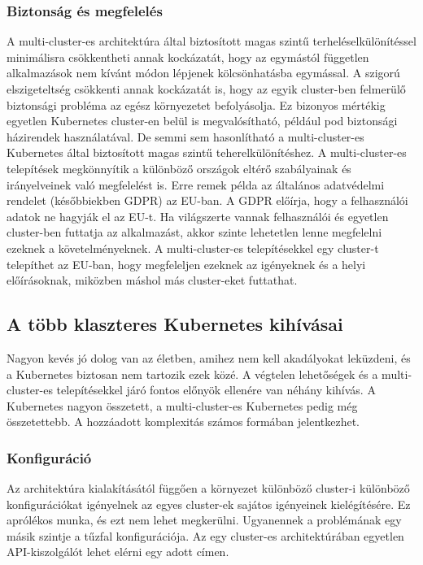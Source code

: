 \subsubsection*{Biztonság és megfelelés}
A multi-cluster-es architektúra által biztosított magas szintű terheléselkülönítéssel minimálisra csökkentheti annak kockázatát, hogy az egymástól független alkalmazások nem kívánt módon lépjenek kölcsönhatásba egymással. A szigorú elszigeteltség csökkenti annak kockázatát is, hogy az egyik cluster-ben felmerülő biztonsági probléma az egész környezetet befolyásolja. Ez bizonyos mértékig egyetlen Kubernetes cluster-en belül is megvalósítható, például pod biztonsági házirendek használatával. De semmi sem hasonlítható a multi-cluster-es Kubernetes által biztosított magas szintű teherelkülönítéshez.
A multi-cluster-es telepítések megkönnyítik a különböző országok eltérő szabályainak és irányelveinek való megfelelést is. Erre remek példa az általános adatvédelmi rendelet (későbbiekben GDPR) az EU-ban. A GDPR előírja, hogy a felhasználói adatok ne hagyják el az EU-t. Ha világszerte vannak felhasználói és egyetlen cluster-ben futtatja az alkalmazást, akkor szinte lehetetlen lenne megfelelni ezeknek a követelményeknek. A multi-cluster-es telepítésekkel egy cluster-t telepíthet az EU-ban, hogy megfeleljen ezeknek az igényeknek és a helyi előírásoknak, miközben máshol más cluster-eket futtathat.
\cite{multicluster}

\subsection{A több klaszteres Kubernetes kihívásai}
Nagyon kevés jó dolog van az életben, amihez nem kell akadályokat leküzdeni, és a Kubernetes biztosan nem tartozik ezek közé. A végtelen lehetőségek és a multi-cluster-es telepítésekkel járó fontos előnyök ellenére van néhány kihívás. A Kubernetes nagyon összetett, a multi-cluster-es Kubernetes pedig még összetettebb. A hozzáadott komplexitás számos formában jelentkezhet.
\cite{multicluster}

\subsubsection*{Konfiguráció}
Az architektúra kialakításától függően a környezet különböző cluster-i különböző konfigurációkat igényelnek az egyes cluster-ek sajátos igényeinek kielégítésére. Ez aprólékos munka, és ezt nem lehet megkerülni. Ugyanennek a problémának egy másik szintje a tűzfal konfigurációja. Az egy cluster-es architektúrában egyetlen API-kiszolgálót lehet elérni egy adott címen.

